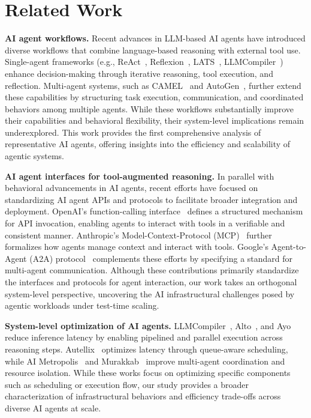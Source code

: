 \section{Related Work}
\label{sect:related_work}

\textbf{AI agent workflows.} Recent advances in LLM-based AI agents have introduced diverse workflows that combine language-based reasoning with external tool use. Single-agent frameworks (e.g., ReAct~\cite{react}, Reflexion~\cite{reflexion}, LATS~\cite{lats}, LLMCompiler~\cite{llmcompiler}) enhance decision-making through iterative reasoning, tool execution, and reflection. Multi-agent systems, such as CAMEL~\cite{camel} and AutoGen~\cite{autogen}, further extend these capabilities by structuring task execution, communication, and coordinated behaviors among multiple agents. 
While these workflows substantially improve their capabilities and behavioral flexibility, their system-level implications remain underexplored. This work provides the first comprehensive analysis of representative AI agents, offering insights into the efficiency and scalability of agentic systems.


\textbf{AI agent interfaces for tool-augmented reasoning.} In parallel with behavioral advancements in AI agents, recent efforts have focused on standardizing AI agent APIs and protocols to facilitate broader integration and deployment. OpenAI’s function-calling interface~\cite{openai_function_calling} defines a structured mechanism for API invocation, enabling agents to interact with tools in a verifiable and consistent manner. Anthropic’s Model-Context-Protocol (MCP)~\cite{mcp} further formalizes how agents manage context and interact with tools. Google’s Agent-to-Agent (A2A) protocol~\cite{agent2agent} complements these efforts by specifying a standard for multi-agent communication.
Although these contributions primarily standardize the interfaces and protocols for agent interaction, our work takes an orthogonal system-level perspective, uncovering the AI infrastructural challenges posed by agentic workloads under test-time scaling.

\textbf{System-level optimization of AI agents.}  
LLMCompiler~\cite{llmcompiler}, Alto~\cite{alto}, and Ayo~\cite{ayo} reduce inference latency by enabling pipelined and parallel execution across reasoning steps. Autellix~\cite{autellix} optimizes latency through queue-aware scheduling, while AI Metropolis~\cite{ai_metropolis} and Murakkab~\cite{murakkab} improve multi-agent coordination and resource isolation. 
While these works focus on optimizing specific components such as scheduling or execution flow, our study provides a broader characterization of infrastructural behaviors and efficiency trade-offs across diverse AI agents at scale.


